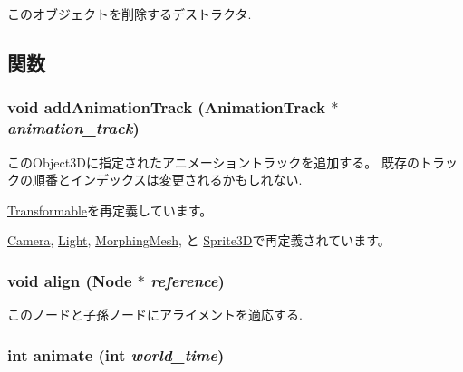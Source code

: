 このオブジェクトを削除するデストラクタ. 

\subsection{関数}
\hypertarget{classm3g_1_1Node_415c0b110f95410ded9b85e5d99a496b}{
\subsubsection[{addAnimationTrack}]{\setlength{\rightskip}{0pt plus 5cm}void addAnimationTrack ({\bf AnimationTrack} $\ast$ {\em animation\_\-track})}}
\label{classm3g_1_1Node_415c0b110f95410ded9b85e5d99a496b}


このObject3Dに指定されたアニメーショントラックを追加する。 既存のトラックの順番とインデックスは変更されるかもしれない. 

\hyperlink{classm3g_1_1Transformable_415c0b110f95410ded9b85e5d99a496b}{Transformable}を再定義しています。

\hyperlink{classm3g_1_1Camera_415c0b110f95410ded9b85e5d99a496b}{Camera}, \hyperlink{classm3g_1_1Light_415c0b110f95410ded9b85e5d99a496b}{Light}, \hyperlink{classm3g_1_1MorphingMesh_415c0b110f95410ded9b85e5d99a496b}{MorphingMesh}, と \hyperlink{classm3g_1_1Sprite3D_415c0b110f95410ded9b85e5d99a496b}{Sprite3D}で再定義されています。\hypertarget{classm3g_1_1Node_3db1b4be060fe3d4f3dbf9720ef85234}{
\subsubsection[{align}]{\setlength{\rightskip}{0pt plus 5cm}void align ({\bf Node} $\ast$ {\em reference})}}
\label{classm3g_1_1Node_3db1b4be060fe3d4f3dbf9720ef85234}


このノードと子孫ノードにアライメントを適応する. \hypertarget{classm3g_1_1Node_8aad1ceab4c2a03609c8a42324ce484d}{
\subsubsection[{animate}]{\setlength{\rightskip}{0pt plus 5cm}int animate (int {\em world\_\-time})}}
\label{classm3g_1_1Node_8aad1ceab4c2a03609c8a42324ce484d}


